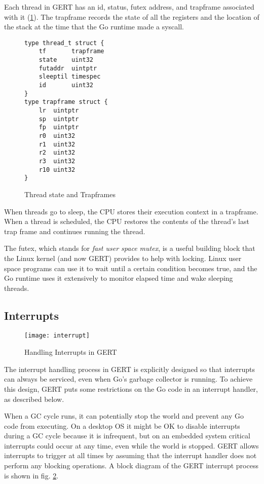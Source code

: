 Each thread in GERT has an id, status, futex address, and trapframe associated with it (\ref{fig:threadtrap}).
The trapframe records the state of all the registers and the location of the stack at
the time that the Go runtime made a syscall.

\begin{figure}[h]
  \begin{lstlisting}
type thread_t struct {
	tf       trapframe
	state    uint32
	futaddr  uintptr
	sleeptil timespec
	id       uint32
}
type trapframe struct {
	lr  uintptr
	sp  uintptr
	fp  uintptr
	r0  uint32
	r1  uint32
	r2  uint32
	r3  uint32
	r10 uint32
}
\end{lstlisting}

  \caption{Thread state and Trapframes} \label{fig:threadtrap}
\end{figure}

When threads go to sleep, the CPU stores their execution context in a trapframe.
When a thread is scheduled, the CPU restores the contents of the thread's last trap
frame and continues running the thread.

The futex, which stands for \textit{fast user space mutex}, is a useful building block
that the Linux kernel (and now GERT) provides to help with locking. Linux user space programs can use
it to wait until a certain condition becomes true, and the Go runtime uses it extensively
to monitor elapsed time and wake sleeping threads.


\subsection{Interrupts}
\begin{figure}[h]
\begin{center}
  \texttt{[image: interrupt]}
\end{center}
  \caption{Handling Interrupts in GERT} \label{fig:interrupt}
\end{figure}

The interrupt handling process in GERT is explicitly designed so
that interrupts can always be serviced, even when Go's garbage collector
is running. To achieve this design, GERT puts some restrictions on the Go code
in an interrupt handler, as described below.

When a GC cycle runs, it can potentially stop the world and
prevent any Go code from executing. On a desktop OS it might be OK to disable
interrupts during a GC cycle because it is infrequent, but on an embedded system
critical interrupts could occur at any time, even while the world is
stopped. GERT allows interrupts to trigger at all times by assuming that the
interrupt handler does not perform any blocking operations. A block diagram
of the GERT interrupt process is shown in fig. \ref{fig:interrupt}.


